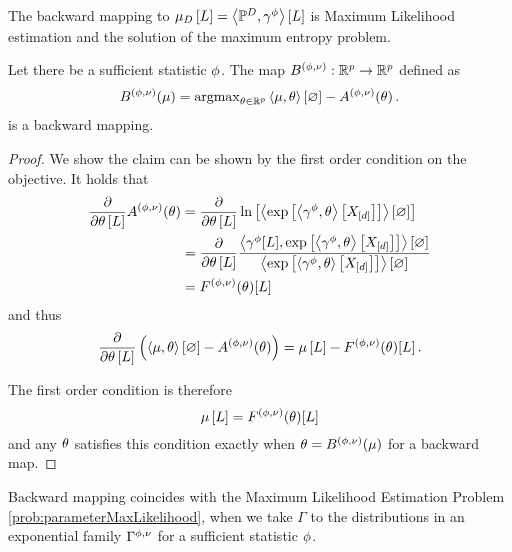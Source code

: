 The backward mapping to $\mu_{D}\left[L\right] = \left\langle \mathbb{P}^{D},\gamma^{\phi}\right\rangle \left[ L \right]$ is Maximum Likelihood estimation and the solution of the maximum entropy problem.

\begin{theorem}\label{the:varBackward}
	Let there be a sufficient statistic $\phi$.
	The map $B^{(\phi,\nu)}: \mathbb{R}^{p}\rightarrow \mathbb{R}^{p}$ defined as
	\begin{align*}
		B^{(\phi,\nu)}(\mu)
		= \mathrm{argmax}_{\theta\in\mathbb{R}^{p}}  \left\langle \mu,\theta\right\rangle \left[ \varnothing \right] - A^{(\phi,\nu)}(\theta) \, . 
	\end{align*}
	is a backward mapping.
\end{theorem}
\begin{proof}
	We show the claim can be shown by the first order condition on the objective.	
	It holds that
	\begin{align*}
		\frac{\partial }{\partial \theta\left[L\right]}  A^{(\phi,\nu)}(\theta)  
		 & = \frac{\partial }{\partial \theta\left[L\right]}  \ln \left[ \left\langle \mathrm{exp}\left[\left\langle \gamma^{\phi},\theta\right\rangle \left[ X_{[d]} \right]\right]\right\rangle \left[ \varnothing \right] \right] \\
		 & = \frac{\partial }{\partial \theta\left[L\right]} \frac{\left\langle \gamma^{\phi}[L],\mathrm{exp}\left[\left\langle \gamma^{\phi},\theta\right\rangle \left[ X_{[d]} \right]\right]\right\rangle \left[ \varnothing \right]}{\left\langle \mathrm{exp}\left[\left\langle \gamma^{\phi},\theta\right\rangle \left[ X_{[d]} \right]\right]\right\rangle \left[ \varnothing \right]}   \\
		 & = F^{(\phi,\nu)}(\theta)[L]
	\end{align*}
	and thus
	\begin{align*}
		\frac{\partial }{\partial \theta\left[L\right]} \left( \left\langle \mu,\theta\right\rangle \left[ \varnothing \right] - A^{(\phi,\nu)}(\theta)  \right) 
		= \mu\left[L\right] -  F^{(\phi,\nu)}(\theta)[L] \, . 
	\end{align*}
	
	The first order condition is therefore 
		\[ \mu\left[L\right] =  F^{(\phi,\nu)}(\theta)[L] \]
	and any $\theta$ satisfies this condition exactly when $\theta=B^{(\phi,\nu)}(\mu)$ for a backward map.
\end{proof}



Backward mapping coincides with the Maximum Likelihood Estimation Problem \eqref{prob:parameterMaxLikelihood}, when we take $\Gamma$ to the distributions in an exponential family $\Gamma^{\phi,\nu}$ for a sufficient statistic $\phi$.

